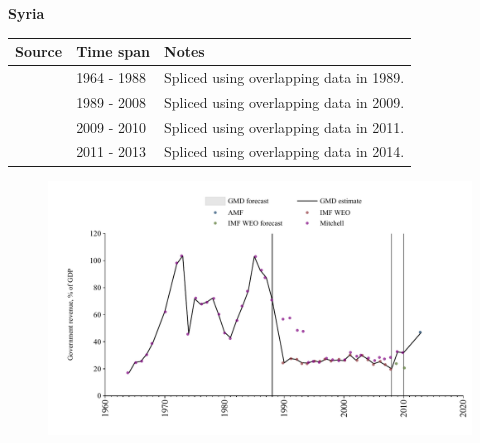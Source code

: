 \documentclass[12pt,a4paper,landscape]{article}
\begin{document}
\begin{adjustbox}{max totalsize={\paperwidth}{\paperheight},center}
\begin{minipage}[t][\textheight][t]{\textwidth}
\vspace*{0.5cm}
{}
\begin{center}
{\Large\bfseries Syria}
\end{center}
\vspace{0.5cm}
\begin{table}[H]
\centering
\small
\begin{tabular}{|l|l|l|}
\hline
\textbf{Source} & \textbf{Time span} & \textbf{Notes} \\
\hline
\rowcolor{white}\cite{Mitchell}& 1964 - 1988 &Spliced using overlapping data in 1989.\\
\rowcolor{lightgray}\cite{IMF_WEO}& 1989 - 2008 &Spliced using overlapping data in 2009.\\
\rowcolor{white}\cite{Mitchell}& 2009 - 2010 &Spliced using overlapping data in 2011.\\
\rowcolor{lightgray}\cite{AMF}& 2011 - 2013 &Spliced using overlapping data in 2014.\\
\hline
\end{tabular}
\end{table}
\begin{figure}[H]
\centering
\includegraphics[width=\textwidth,height=0.6\textheight,keepaspectratio]{graphs/SYR_govrev_GDP.pdf}
\end{figure}
\end{minipage}
\end{adjustbox}
\end{document}
